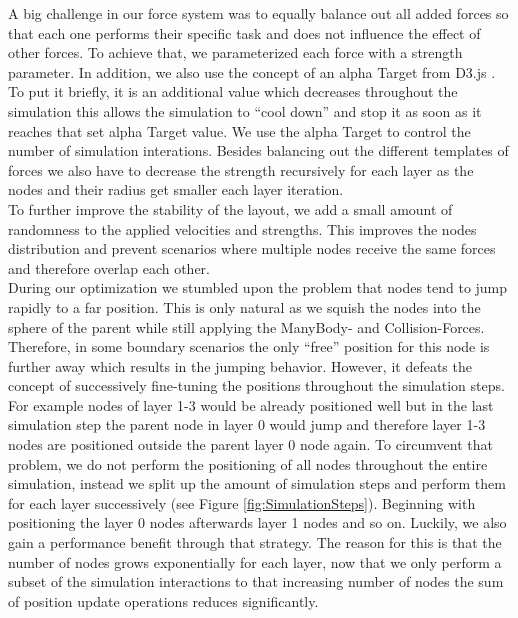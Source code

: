 A big challenge in our force system was to equally balance out all added forces so that each one performs their specific task and does not influence the effect of other forces. To achieve that, we parameterized each force with a strength parameter.
In addition, we also use the concept of an alpha Target from D3.js \cite{bostock_d3js_nodate}. To put it briefly, it is an additional value which decreases throughout the simulation this allows the simulation to “cool down” and stop it as soon as it reaches that set alpha Target value. We use the alpha Target to control the number of simulation interations. 
Besides balancing out the different templates of forces we also have to decrease the strength recursively for each layer as the nodes and their radius get smaller each layer iteration.\\
To further improve the stability of the layout, we add a small amount of randomness to the applied velocities and strengths. This improves the nodes distribution and prevent scenarios where multiple nodes receive the same forces and therefore overlap each other.\\
During our optimization we stumbled upon the problem that nodes tend to jump rapidly to a far position. This is only natural as we squish the nodes into the sphere of the parent while still applying the ManyBody- and Collision-Forces. Therefore, in some boundary scenarios the only “free” position for this node is further away which results in the jumping behavior. However, it defeats the concept of successively fine-tuning the positions throughout the simulation steps. For example nodes of layer 1-3 would be already positioned well but in the last simulation step the parent node in layer 0 would jump and therefore layer 1-3 nodes are positioned outside the parent layer 0 node again. To circumvent that problem, we do not perform the positioning of all nodes throughout the entire simulation, instead we split up the amount of simulation steps and perform them for each layer successively (see Figure \ref{fig:SimulationSteps}). Beginning with positioning the layer 0 nodes afterwards layer 1 nodes and so on. Luckily, we also gain a performance benefit through that strategy. The reason for this is that the number of nodes grows exponentially for each layer, now that we only perform a subset of the simulation interactions to that increasing number of nodes the sum of position update operations reduces significantly.

